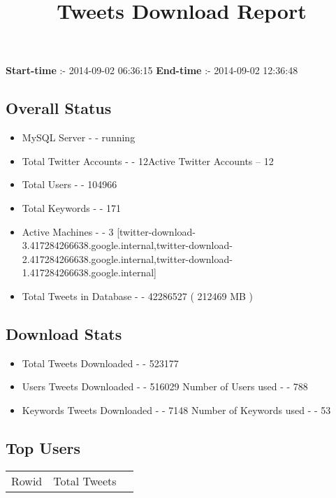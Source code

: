 \documentclass{article}\usepackage[T1]{fontenc}
\begin{document}
\title{\textbf{Tweets Download Report}}
               \date{}
                \maketitle
               \centerline{\textbf{Start-time} :- 2014-09-02 06:36:15 \hspace{40pt} \textbf{End-time} :- 2014-09-02 12:36:48}               \subsection*{Overall Status}                \begin{itemize}                \item MySQL Server - - running               \item Total Twitter Accounts - - 12\newline Active Twitter Accounts -- 12               \item Total Users - - 104966               \item Total Keywords - - 171               \item Active Machines - - 3 [twitter-download-3.417284266638.google.internal,twitter-download-2.417284266638.google.internal,twitter-download-1.417284266638.google.internal]               \item Total Tweets in Database - - 42286527 ( 212469 MB )               \end{itemize}               \subsection*{Download Stats}                \begin{itemize}                \item Total Tweets Downloaded - - 523177               \item Users Tweets Downloaded - - 516029 \newline Number of Users used - - 788               \item Keywords Tweets Downloaded - - 7148 \newline Number of Keywords used - - 53              \end{itemize}              \subsection*{Top Users}\begin{tabular}{|c|c|c|}         \hline         Rowid & Total Tweets \\ 

\end{tabular}
\end{document}
